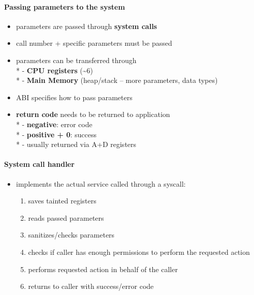 \paragraph{Passing parameters to the system}
\begin{itemize}
  \item parameters are passed through \textbf{system calls}
  \item call number + specific parameters must be passed
  \item parameters can be transferred through \\*
    - \textbf{CPU registers} (\textasciitilde 6) \\*
    - \textbf{Main Memory} (heap/stack -- more parameters, data types)
  \item ABI specifies how to pass parameters
  \item \textbf{return code} needs to be returned to application \\*
    - \textbf{negative}: error code \\*
    - \textbf{positive + 0}: success \\*
    - usually returned via A+D registers
\end{itemize}

\paragraph{System call handler}
\begin{itemize}
  \item implements the actual service called through a syscall:
  \begin{enumerate}
    \item saves tainted registers
    \item reads passed parameters
    \item sanitizes/checks parameters
    \item checks if caller has enough permissions to perform the requested action
    \item performs requested action in behalf of the caller
    \item returns to caller with success/error code
  \end{enumerate}
\end{itemize}

